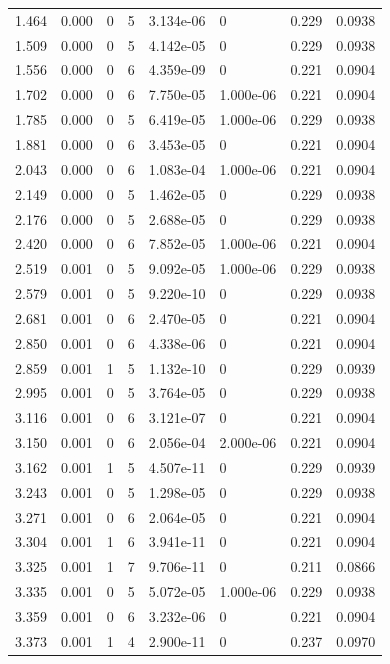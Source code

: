 \documentclass[preview]{standalone}
\begin{document}
{{\begin{tabular}{L{1.2cm}C{1.2cm} C{0.3cm}C{0.5cm} C{1.4cm}C{1.4cm} C{1.4cm}C{1.4cm}}
  1.464  &  0.000  & 0     &  5 &  3.134e-06  & 0  & 0.229 &  0.0938   \\ 
  1.509  &  0.000  & 0     &  5 &  4.142e-05  & 0  & 0.229 &  0.0938   \\ 
  1.556  &  0.000  & 0     &  6 &  4.359e-09  & 0  & 0.221 &  0.0904   \\ 
  1.702  &  0.000  & 0     &  6 &  7.750e-05  & 1.000e-06  & 0.221 &  0.0904   \\ 
  1.785  &  0.000  & 0     &  5 &  6.419e-05  & 1.000e-06  & 0.229 &  0.0938   \\ 
  1.881  &  0.000  & 0     &  6 &  3.453e-05  & 0  & 0.221 &  0.0904   \\ 
  2.043  &  0.000  & 0     &  6 &  1.083e-04  & 1.000e-06  & 0.221 &  0.0904   \\ 
  2.149  &  0.000  & 0     &  5 &  1.462e-05  & 0  & 0.229 &  0.0938   \\ 
  2.176  &  0.000  & 0     &  5 &  2.688e-05  & 0  & 0.229 &  0.0938   \\ 
  2.420  &  0.000  & 0     &  6 &  7.852e-05  & 1.000e-06  & 0.221 &  0.0904   \\ 
  2.519  &  0.001  & 0     &  5 &  9.092e-05  & 1.000e-06  & 0.229 &  0.0938   \\ 
  2.579  &  0.001  & 0     &  5 &  9.220e-10  & 0  & 0.229 &  0.0938   \\ 
  2.681  &  0.001  & 0     &  6 &  2.470e-05  & 0  & 0.221 &  0.0904   \\ 
  2.850  &  0.001  & 0     &  6 &  4.338e-06  & 0  & 0.221 &  0.0904   \\ 
  2.859  &  0.001  & 1     &  5 &  1.132e-10  & 0  & 0.229 &  0.0939   \\ 
  2.995  &  0.001  & 0     &  5 &  3.764e-05  & 0  & 0.229 &  0.0938   \\ 
  3.116  &  0.001  & 0     &  6 &  3.121e-07  & 0  & 0.221 &  0.0904   \\ 
  3.150  &  0.001  & 0     &  6 &  2.056e-04  & 2.000e-06  & 0.221 &  0.0904   \\ 
  3.162  &  0.001  & 1     &  5 &  4.507e-11  & 0  & 0.229 &  0.0939   \\ 
  3.243  &  0.001  & 0     &  5 &  1.298e-05  & 0  & 0.229 &  0.0938   \\ 
  3.271  &  0.001  & 0     &  6 &  2.064e-05  & 0  & 0.221 &  0.0904   \\ 
  3.304  &  0.001  & 1     &  6 &  3.941e-11  & 0  & 0.221 &  0.0904   \\ 
  3.325  &  0.001  & 1     &  7 &  9.706e-11  & 0  & 0.211 &  0.0866   \\ 
  3.335  &  0.001  & 0     &  5 &  5.072e-05  & 1.000e-06  & 0.229 &  0.0938   \\ 
  3.359  &  0.001  & 0     &  6 &  3.232e-06  & 0  & 0.221 &  0.0904   \\ 
  3.373  &  0.001  & 1     &  4 &  2.900e-11  & 0  & 0.237 &  0.0970   \\ 
\hline 
\end{tabular} 

}}
\end{document}
